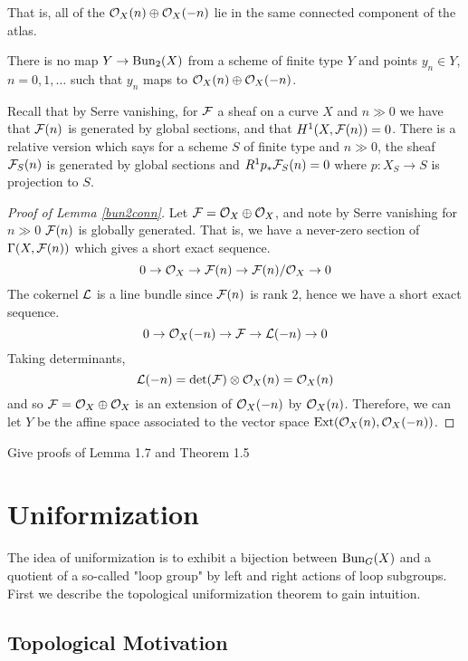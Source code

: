 \documentclass[12pt]{article}
\begin{document}
That is, all of the $\mathcal{O}_X(n) \oplus \mathcal{O}_X(-n)$ lie in the same connected component of the atlas.

\begin{lem}\label{bun2ft}
    There is no map $Y \to \operatorname{Bun}_2(X)$ from a scheme of finite type $Y$ and points $y_n \in Y$, $n = 0,1,\ldots$ such that $y_n$ maps to $ \mathcal{O}_X(n) \oplus \mathcal{O}_X(-n)$. 
\end{lem}

Recall that by Serre vanishing, for $\mathcal{F}$ a sheaf on a curve $X$ and $n \gg 0$ we have that $\mathcal{F}(n)$ is generated by global sections, and that $H^1(X, \mathcal{F}(n)) = 0$. There is a relative version which says for a scheme $S$ of finite type and $n \gg 0$, the sheaf $\mathcal{F}_S(n)$ is generated by global sections and $R^1p_* \mathcal{F}_S(n) = 0$ where $p \colon X_S \to S$ is projection to $S$.

\begin{proof}[Proof of Lemma \ref{bun2conn}] Let $\mathcal{F} = \mathcal{O}_X \oplus \mathcal{O}_X$, and note by Serre vanishing for $n \gg 0$ $\mathcal{F}(n)$ is globally generated. That is, we have a never-zero section of $\Gamma(X, \mathcal{F}(n))$ which gives a short exact sequence.
\[0 \to \mathcal{O}_X \to \mathcal{F}(n) \to \mathcal{F}(n)/\mathcal{O}_X \to 0\]
The cokernel $\mathcal{L}$ is a line bundle since $\mathcal{F}(n)$ is rank $2$, hence we have a short exact sequence.
\[0 \to \mathcal{O}_X(-n) \to \mathcal{F} \to \mathcal{L}(-n) \to 0\]
Taking determinants, 
\[\mathcal{L}(-n) = \det(\mathcal{F}) \otimes \mathcal{O}_X(n) = \mathcal{O}_X(n)\]
and so $\mathcal{F} = \mathcal{O}_X \oplus \mathcal{O}_X$ is an extension of $\mathcal{O}_X(-n)$ by $\mathcal{O}_X(n)$. Therefore, we can let $Y$ be the affine space associated to the vector space $\operatorname{Ext}(\mathcal{O}_X(n), \mathcal{O}_X(-n))$.
\end{proof}

\begin{todo}
    Give proofs of Lemma 1.7 and Theorem 1.5
\end{todo}

\section{Uniformization}

The idea of uniformization is to exhibit a bijection between $\operatorname{Bun}_G(X)$ and a quotient of a so-called "loop group" by left and right actions of loop subgroups. First we describe the topological uniformization theorem to gain intuition.

\subsection{Topological Motivation}
\end{document}
